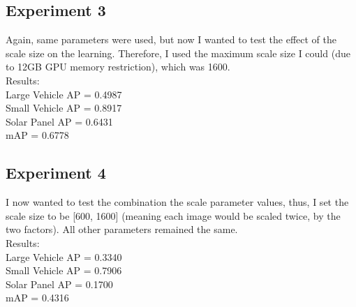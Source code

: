 \documentclass[]{article}
\begin{document}
\subsection{Experiment 3}
Again, same parameters were used, but now I wanted to test the effect of the scale size on the learning. Therefore, I used the maximum scale size I could (due to 12GB GPU memory restriction), which was 1600.\\
Results:\\
Large Vehicle AP = 0.4987\\
Small Vehicle AP = 0.8917\\
Solar Panel AP = 0.6431\\
mAP = 0.6778

\subsection{Experiment 4}
I now wanted to test the combination the scale parameter values, thus, I set the scale size to be [600, 1600] (meaning each image would be scaled twice, by the two factors). All other parameters remained the same.\\
Results:\\
Large Vehicle AP = 0.3340\\
Small Vehicle AP = 0.7906\\
Solar Panel AP = 0.1700\\
mAP = 0.4316
\end{document}
